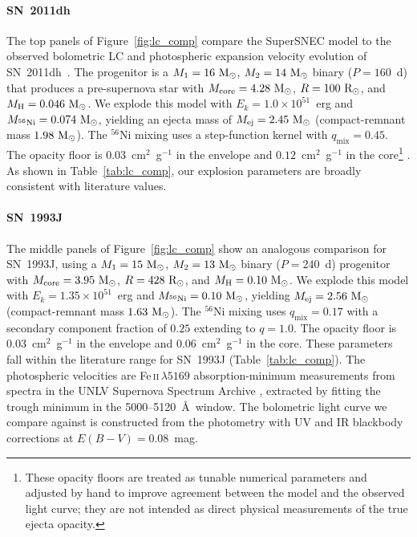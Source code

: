 \documentclass[twocolumn,linenumbers]{aastex701}
\begin{document}
\paragraph{SN~2011dh}
The top panels of Figure~\ref{fig:lc_comp} compare the SuperSNEC model to the observed bolometric LC and photospheric expansion velocity evolution of SN~2011dh~\citep{Ergon2014}. The progenitor is a $M_1 = 16~{\rm M}_\odot$, $M_2 = 14~{\rm M}_\odot$ binary ($P = 160$~d) that produces a pre-supernova star with $M_\mathrm{core} = 4.28~{\rm M}_\odot$, $R = 100~{\rm R}_\odot$, and $M_\mathrm{H} = 0.046~{\rm M}_\odot$. We explode this model with $E_k = 1.0 \times 10^{51}$~erg and $M_{^{56}\mathrm{Ni}} = 0.074~{\rm M}_\odot$, yielding an ejecta mass of $M_\mathrm{ej} = 2.45~{\rm M}_\odot$ (compact-remnant mass $1.98~{\rm M}_\odot$). The $^{56}$Ni mixing uses a step-function kernel with $q_\mathrm{mix} = 0.45$. The opacity floor is $0.03$~cm$^2$~g$^{-1}$ in the envelope and $0.12$~cm$^2$~g$^{-1}$ in the core\footnote{These opacity floors are treated as tunable numerical parameters and adjusted by hand to improve agreement between the model and the observed light curve; they are not intended as direct physical measurements of the true ejecta opacity.}
. As shown in Table~\ref{tab:lc_comp}, our explosion parameters are broadly consistent with literature values.%

\paragraph{SN~1993J}
The middle panels of Figure~\ref{fig:lc_comp} show an analogous comparison for SN~1993J, using a $M_1 = 15~{\rm M}_\odot$, $M_2 = 13~{\rm M}_\odot$ binary ($P = 240$~d) progenitor with $M_\mathrm{core} = 3.95~{\rm M}_\odot$, $R = 428~{\rm R}_\odot$, and $M_\mathrm{H} = 0.10~{\rm M}_\odot$. We explode this model with $E_k = 1.35 \times 10^{51}$~erg and $M_{^{56}\mathrm{Ni}} = 0.10~{\rm M}_\odot$, yielding $M_\mathrm{ej} = 2.56~{\rm M}_\odot$ (compact-remnant mass $1.63~{\rm M}_\odot$). The $^{56}$Ni mixing uses $q_\mathrm{mix} = 0.17$ with a secondary component fraction of $0.25$ extending to $q = 1.0$. The opacity floor is $0.03$~cm$^2$~g$^{-1}$ in the envelope and $0.06$~cm$^2$~g$^{-1}$ in the core. These parameters fall within the literature range for SN~1993J (Table~\ref{tab:lc_comp}). The photospheric velocities are Fe\,\textsc{ii}\,$\lambda5169$ absorption-minimum measurements from spectra in the UNLV Supernova Spectrum Archive \citep{Barbon1995}, extracted by fitting the trough minimum in the 5000--5120~\AA\ window. The bolometric light curve we compare against is constructed from the \citet{Richmond1994} photometry with UV and IR blackbody corrections at $E(B-V) = 0.08$~mag.
\end{document}
